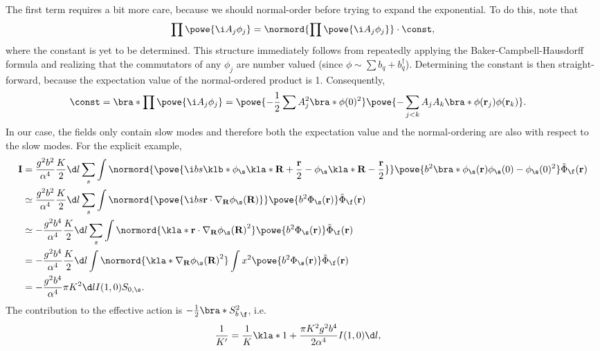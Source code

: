 \documentclass[english, parskip=full]{scrartcl}
\begin{document}
The first term requires a bit more care, because we should normal-order before trying to expand the exponential.
To do this, note that
\begin{align}
\prod \powe{\i A_j \phi_j} = \normord{\prod \powe{\i A_j \phi_j}} \cdot \const,
\end{align}
where the constant is yet to be determined.
This structure immediately follows from repeatedly applying the Baker-Campbell-Hausdorff formula and realizing that the commutators of any $\phi_j$ are number valued (since $\phi\sim \sum b_q + b_q^\dagger$).
Determining the constant is then straight-forward, because the expectation value of the normal-ordered product is 1.
Consequently,
\begin{align}
\const &= \bra*{\prod \powe{\i A_j \phi_j}} = \powe{-\frac{1}{2} \sum A_j^2 \bra*{\phi(0)^2}} \powe{-\sum_{j<k} A_jA_k \bra*{\phi(\textbf{r}_j) \phi(\textbf{r}_k)}}.
\end{align}
In our case, the fields only contain slow modes and therefore both the expectation value and the normal-ordering are also with respect to the slow modes.
For the explicit example,
\begin{align}
\textbf{I} &= \frac{g^2b^2}{\alpha^4} \frac{K}{2}\d l \sum_s \int \normord{\powe{\i bs \klb*{\phi_\s\kla*{\textbf{R} + \frac{\textbf{r}}{2}} - \phi_\s\kla*{\textbf{R} - \frac{\textbf{r}}{2}}}}} \powe{b^2 \bra*{\phi_\s(\textbf{r}) \phi_\s(0) - \phi_\s(0)^2} } \tilde{\Phi}_\f(\textbf{r})\\
&\simeq \frac{g^2b^2}{\alpha^4} \frac{K}{2}\d l \sum_s\int  \normord{\powe{\i bs \textbf{r}\cdot \nabla_\textbf{R} \phi_\s(\textbf{R})}} \powe{b^2 \Phi_\s(\textbf{r}) } \tilde{\Phi}_\f(\textbf{r})\\
&\simeq -\frac{g^2b^4}{\alpha^4} \frac{K}{2}\d l \sum_s \int \normord{\kla*{\textbf{r}\cdot \nabla_\textbf{R} \phi_\s(\textbf{R})}^2} \powe{b^2 \Phi_\s(\textbf{r}) } \tilde{\Phi}_\f(\textbf{r})\\
&= -\frac{g^2b^4}{\alpha^4} \frac{K}{2}\d l \int \normord{\kla*{\nabla_\textbf{R} \phi_\s(\textbf{R})}^2} \int x^2 \powe{b^2 \Phi_\s(\textbf{r}) } \tilde{\Phi}_\f(\textbf{r})\\
&= -\frac{g^2b^4}{\alpha^4} \pi K^2 \d l I(1,0) S_{0,\s}.
\end{align}
The contribution to the effective action is $-\frac{1}{2} \bra*{S_b^2}_\f$, i.e.
\begin{align}
\frac{1}{K'} &= \frac{1}{K}\kla*{1 + \frac{\pi K^2g^2b^4}{2\alpha^4} I(1,0) \d l},
\end{align}
\end{document}
